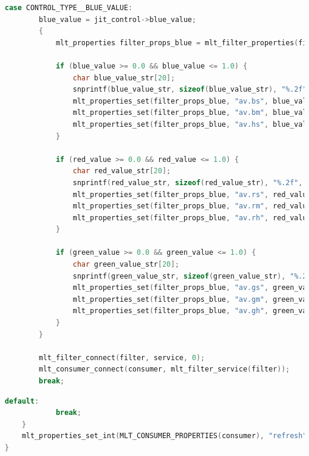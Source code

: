 \documentclass[../MasterThesis.tex]{subfiles}
\begin{document}
\begin{lstlisting}[language=c, numbers=none, columns=fullflexible]	
	case CONTROL_TYPE__BLUE_VALUE:
		blue_value = jit_control->blue_value;
		{
			mlt_properties filter_props_blue = mlt_filter_properties(filter);
				
			if (blue_value >= 0.0 && blue_value <= 1.0) {
				char blue_value_str[20]; 
				snprintf(blue_value_str, sizeof(blue_value_str), "%.2f", blue_value);
				mlt_properties_set(filter_props_blue, "av.bs", blue_value_str);
				mlt_properties_set(filter_props_blue, "av.bm", blue_value_str);
				mlt_properties_set(filter_props_blue, "av.hs", blue_value_str);
			}
				
			if (red_value >= 0.0 && red_value <= 1.0) {
				char red_value_str[20]; 
				snprintf(red_value_str, sizeof(red_value_str), "%.2f", red_value);
				mlt_properties_set(filter_props_blue, "av.rs", red_value_str);
				mlt_properties_set(filter_props_blue, "av.rm", red_value_str);
				mlt_properties_set(filter_props_blue, "av.rh", red_value_str);
			}
				
			if (green_value >= 0.0 && green_value <= 1.0) {
				char green_value_str[20]; 
				snprintf(green_value_str, sizeof(green_value_str), "%.2f", green_value);
				mlt_properties_set(filter_props_blue, "av.gs", green_value_str);
				mlt_properties_set(filter_props_blue, "av.gm", green_value_str);
				mlt_properties_set(filter_props_blue, "av.gh", green_value_str);
			}
		}
			
		mlt_filter_connect(filter, service, 0);
		mlt_consumer_connect(consumer, mlt_filter_service(filter));
		break;  

\end{lstlisting}


\begin{lstlisting}[language=c, numbers=none, columns=fullflexible]		
		default:
			break;
	}
	mlt_properties_set_int(MLT_CONSUMER_PROPERTIES(consumer), "refresh", 1);
}

\end{lstlisting}

	
	
	
\end{document}
